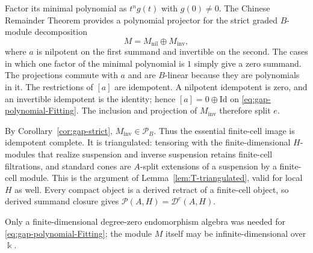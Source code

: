 \documentclass[11pt]{article}
\theoremstyle{definition}
\newtheorem{cor}[thm]{Corollary}
\numberwithin{equation}{section}
\def\Id{\mathrm{Id}}
\newcommand{\kk}{\Bbbk}
\newcommand{\Pun}{\mathcal{P}_B}
\newcommand{\Tcat}{\mathcal{P}(A,H)}
\newcommand{\Dc}{\mathcal{D}^c(A,H)}
\begin{document}
Factor its minimal polynomial as $t^n g(t)$ with $g(0)\ne0$.
The Chinese Remainder Theorem provides a polynomial projector for the
strict graded $B$-module decomposition
\begin{equation}\label{eq:gap-polynomial-Fitting}
 M=M_{\mathrm{nil}}\oplus M_{\mathrm{inv}},
\end{equation}
where $a$ is nilpotent on the first summand and invertible on the second.
The cases in which one factor of the minimal polynomial is $1$ simply
give a zero summand.  The projections commute with $a$ and are
$B$-linear because they are polynomials in it.
The restrictions of $[a]$ are idempotent.  A nilpotent idempotent is
zero, and an invertible idempotent is the identity; hence
$[a]=0\oplus\Id$ on \eqref{eq:gap-polynomial-Fitting}.
The inclusion and projection of $M_{\mathrm{inv}}$ therefore split $e$.

By Corollary~\ref{cor:gap-strict}, $M_{\mathrm{inv}}\in\Pun$.
Thus the essential finite-cell image is idempotent complete.
It is triangulated: tensoring with the finite-dimensional $H$-modules
that realize suspension and inverse suspension retains finite-cell
filtrations, and standard cones are $A$-split extensions of a
suspension by a finite-cell module.  This is the argument of
Lemma~\ref{lem:T-triangulated}, valid for local $H$ as well.
Every compact object is a derived retract of a finite-cell object,
so derived summand closure gives $\Tcat=\Dc$.

Only a finite-dimensional degree-zero endomorphism algebra was needed
for \eqref{eq:gap-polynomial-Fitting}; the module $M$ itself may be
infinite-dimensional over $\kk$.

\end{document}
